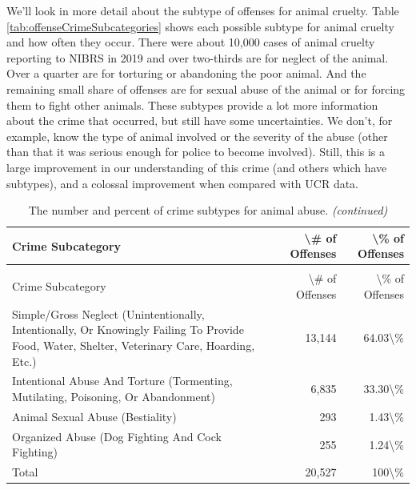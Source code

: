 \documentclass[
]{krantz}
\begin{document}
We'll look in more detail about the subtype of offenses for
animal cruelty. Table \ref{tab:offenseCrimeSubcategories}
shows each possible subtype for animal cruelty and how often
they occur. There were about 10,000 cases of animal cruelty
reporting to NIBRS in 2019 and over two-thirds are for
neglect of the animal. Over a quarter are for torturing or
abandoning the poor animal. And the remaining small share of
offenses are for sexual abuse of the animal or for forcing
them to fight other animals. These subtypes provide a lot
more information about the crime that occurred, but still
have some uncertainties. We don't, for example, know the
type of animal involved or the severity of the abuse (other
than that it was serious enough for police to become
involved). Still, this is a large improvement in our
understanding of this crime (and others which have
subtypes), and a colossal improvement when compared with UCR
data.

\begin{longtable}[t]{lrr}
\caption{\label{tab:offenseCrimeSubcategoriesAnimalAbuse}\label{tab:offenseCrimeSubcategoriesAnimalAbuse}The number and percent of crime subtypes for animal abuse.}\\
\toprule
Crime Subcategory & \textbackslash{}\# of Offenses & \textbackslash{}\% of Offenses\\
\midrule
\endfirsthead
\caption[]{\label{tab:offenseCrimeSubcategoriesAnimalAbuse}\label{tab:offenseCrimeSubcategoriesAnimalAbuse}The number and percent of crime subtypes for animal abuse. \textit{(continued)}}\\
\toprule
Crime Subcategory & \textbackslash{}\# of Offenses & \textbackslash{}\% of Offenses\\
\midrule
\endhead

\endfoot
\bottomrule
\endlastfoot
Simple/Gross Neglect (Unintentionally, Intentionally, Or Knowingly Failing To Provide Food, Water, Shelter, Veterinary Care, Hoarding, Etc.) & 13,144 & 64.03\textbackslash{}\%\\
Intentional Abuse And Torture (Tormenting, Mutilating, Poisoning, Or Abandonment) & 6,835 & 33.30\textbackslash{}\%\\
Animal Sexual Abuse (Bestiality) & 293 & 1.43\textbackslash{}\%\\
Organized Abuse (Dog Fighting And Cock Fighting) & 255 & 1.24\textbackslash{}\%\\
Total & 20,527 & 100\textbackslash{}\%\\*
\end{longtable}
\end{document}

